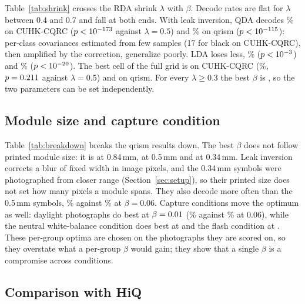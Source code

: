 

Table~\ref{tab:shrink} crosses the RDA shrink $\lambda$ with $\beta$. Decode rates are flat
for $\lambda$ between 0.4 and 0.7 and fall at both ends. With leak inversion, QDA decodes
\HiqCodeQda\% on CUHK-CQRC ($p<10^{-173}$ against $\lambda=0.5$) and \QrCodeQda\% on qrism
($p<10^{-115}$): per-class covariances estimated from few samples (17 for black on
CUHK-CQRC), then amplified by the correction, generalize poorly. LDA loses less, \HiqCodeLda\% ($p<10^{-3}$)
and \QrCodeLda\% ($p<10^{-20}$). The best cell of the full grid is \HiqGridBest{} on CUHK-CQRC
(\HiqGridBestCode\%, $p=0.211$ against $\lambda=0.5$) and \QrGridBest{} on qrism. For
every $\lambda \geq 0.3$ the best $\beta$ is \GridBestBetaRange, so the two parameters can
be set independently.

\subsection{Module size and capture condition}



Table~\ref{tab:breakdown} breaks the qrism results down. The best $\beta$ does not follow
printed module size: it is \QrBestBetaPxTwenty{} at 0.84\,mm, \QrBestBetaPxTwelve{} at 0.5\,mm
and \QrBestBetaPxEight{} at 0.34\,mm. Leak inversion corrects a blur of fixed width in image
pixels, and the 0.34\,mm symbols were photographed from closer range
(Section~\ref{sec:setup}), so their printed size does not set how many pixels a module spans.
They also decode more often than the 0.5\,mm symbols, \QrCodeChosenPxEight\% against
\QrCodeChosenPxTwelve\% at $\beta=0.06$. Capture conditions move the optimum as well: daylight photographs do
best at $\beta=0.01$ (\QrBestCodeDaylight\% against \QrCodeChosenDaylight\%
at 0.06), while the neutral white-balance condition does best at \QrBestBetaWbNeutral{} and
the flash condition at \QrBestBetaFlashlight. These per-group optima are chosen on the photographs they are
scored on, so they overstate what a per-group $\beta$ would gain; they show that a single
$\beta$ is a compromise across conditions.

\subsection{Comparison with HiQ}
\label{sec:hiq}



